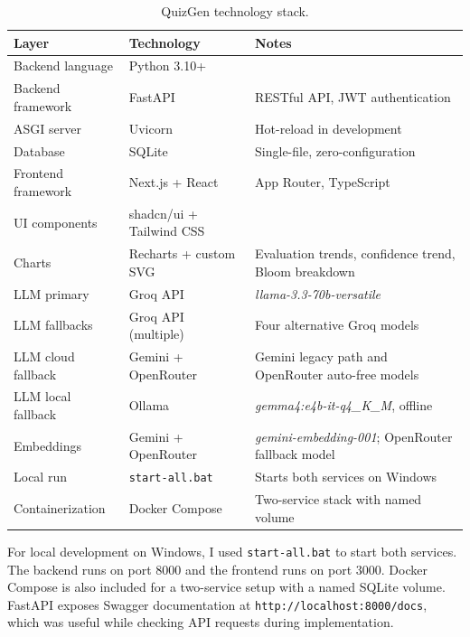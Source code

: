\documentclass[12pt,a4paper]{article}
\begin{document}
\begin{table}[H]
  \centering
  \singlespacing
  \caption{QuizGen technology stack.}
  \label{tab:tech-stack}
  \small
  \begin{tabular}{@{}p{3.0cm}p{3.4cm}p{7.0cm}@{}}
    \toprule
    \textbf{Layer} & \textbf{Technology} & \textbf{Notes} \\
    \midrule
    Backend language    & Python 3.10+             & \\
    Backend framework   & FastAPI                  & RESTful API, JWT authentication \\
    ASGI server         & Uvicorn                  & Hot-reload in development \\
    Database            & SQLite                   & Single-file, zero-configuration \\
    Frontend framework  & Next.js + React          & App Router, TypeScript \\
    UI components       & shadcn/ui + Tailwind CSS & \\
    Charts              & Recharts + custom SVG    & Evaluation trends, confidence trend, Bloom breakdown \\
    LLM primary         & Groq API                 & \textit{llama-3.3-70b-versatile} \\
    LLM fallbacks       & Groq API (multiple)      & Four alternative Groq models \\
    LLM cloud fallback  & Gemini + OpenRouter      & Gemini legacy path and OpenRouter auto-free models \\
    LLM local fallback  & Ollama                   & \textit{gemma4:e4b-it-q4\_K\_M}, offline \\
    Embeddings          & Gemini + OpenRouter      & \textit{gemini-embedding-001}; OpenRouter fallback model \\
    Local run           & \texttt{start-all.bat}   & Starts both services on Windows \\
    Containerization    & Docker Compose           & Two-service stack with named volume \\
    \bottomrule
  \end{tabular}
\end{table}

For local development on Windows, I used \texttt{start-all.bat} to start
both services. The backend runs on port 8000 and the frontend runs on port
3000. Docker Compose is also included for a two-service setup with a named
SQLite volume. FastAPI exposes Swagger documentation at
\texttt{http://localhost:8000/docs}, which was useful while checking API
requests during implementation.
\end{document}
